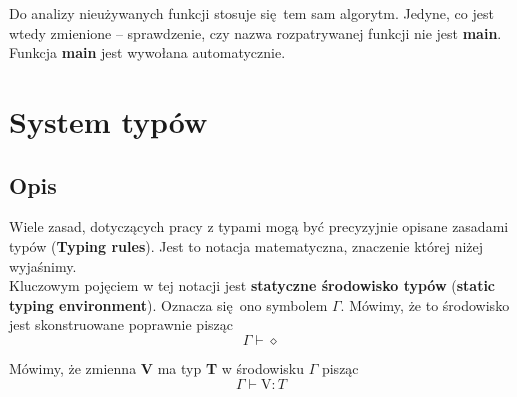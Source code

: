 \documentclass[a4paper, 12pt]{extarticle}
\newcommand{\spacing}{\vskip 0.5cm}
\begin{document}
			Do analizy nieużywanych funkcji stosuje się tem sam algorytm. Jedyne, co jest wtedy zmienione --
			sprawdzenie, czy nazwa rozpatrywanej funkcji nie jest \textbf{main}. Funkcja \textbf{main} jest
			wywołana automatycznie.
		
		
%
		

		
		\section{System typów}
		
			\subsection{Opis}

				Wiele zasad, dotyczących pracy z typami mogą być precyzyjnie opisane zasadami typów
				(\textbf{Typing rules}). Jest to notacja matematyczna, znaczenie której niżej wyjaśnimy.
				\\
				
				Kluczowym pojęciem w tej notacji jest \textbf{statyczne środowisko typów}
				(\textbf{static typing environment}). Oznacza się ono symbolem $\Gamma$. Mówimy, że to
				środowisko jest skonstruowane poprawnie pisząc $$\Gamma \vdash \diamond$$
				
				Mówimy, że zmienna \textbf{V} ma typ \textbf{T} w środowisku $\Gamma$ pisząc
				$$\Gamma \vdash \text{V} : T$$
				
\end{document}

